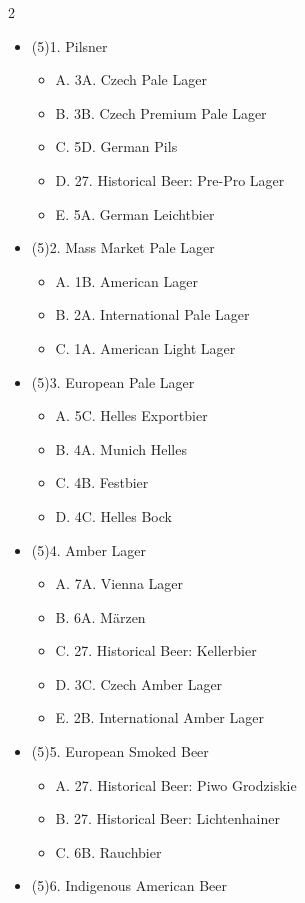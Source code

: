 \begin{multicols*}{2}
\begin{itemize}[noitemsep]
\item[] (5)1. Pilsner
\begin{itemize}
  \item[] A. 3A. Czech Pale Lager
  \item[] B. 3B. Czech Premium Pale Lager
  \item[] C. 5D. German Pils
  \item[] D. 27. Historical Beer: Pre-Pro Lager
  \item[] E. 5A. German Leichtbier
\end{itemize}
\item[] (5)2. Mass Market Pale Lager
\begin{itemize}
  \item[] A. 1B. American Lager
  \item[] B. 2A. International Pale Lager
  \item[] C. 1A. American Light Lager
\end{itemize}
\item[] (5)3. European Pale Lager
\begin{itemize}
  \item[] A. 5C. Helles Exportbier
  \item[] B. 4A. Munich Helles
  \item[] C. 4B. Festbier
  \item[] D. 4C. Helles Bock
\end{itemize}
\item[] (5)4. Amber Lager
\begin{itemize}
  \item[] A. 7A. Vienna Lager
  \item[] B. 6A. Märzen
  \item[] C. 27. Historical Beer: Kellerbier
  \item[] D. 3C. Czech Amber Lager
  \item[] E. 2B. International Amber Lager
\end{itemize}
\item[] (5)5. European Smoked Beer
\begin{itemize}
  \item[] A. 27. Historical Beer: Piwo Grodziskie
  \item[] B. 27. Historical Beer: Lichtenhainer
  \item[] C. 6B. Rauchbier
\end{itemize}
\item[] (5)6. Indigenous American Beer
\begin{itemize}

\end{itemize}
\end{itemize}
\end{multicols*}
